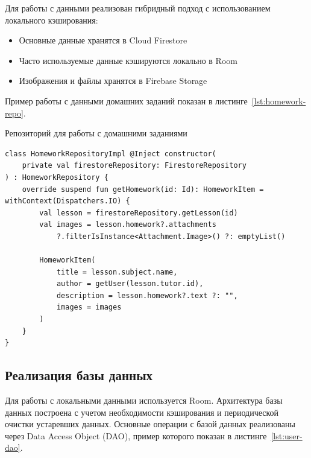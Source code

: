 \documentclass[14pt, russian]{scrartcl}
\begin{document}
Для работы с данными реализован гибридный подход с использованием локального кэширования:
\begin{itemize}
\item Основные данные хранятся в Cloud Firestore
\item Часто используемые данные кэшируются локально в Room
\item Изображения и файлы хранятся в Firebase Storage
\end{itemize}

Пример работы с данными домашних заданий показан в листинге~\ref{lst:homework-repo}.

\begin{listing}[!htb]
\caption{Репозиторий для работы с домашними заданиями}
\vspace{-0.3cm}
\label{lst:homework-repo}
\begin{verbatim}
class HomeworkRepositoryImpl @Inject constructor(
    private val firestoreRepository: FirestoreRepository
) : HomeworkRepository {
    override suspend fun getHomework(id: Id): HomeworkItem = withContext(Dispatchers.IO) {
        val lesson = firestoreRepository.getLesson(id)
        val images = lesson.homework?.attachments
            ?.filterIsInstance<Attachment.Image>() ?: emptyList()

        HomeworkItem(
            title = lesson.subject.name,
            author = getUser(lesson.tutor.id),
            description = lesson.homework?.text ?: "",
            images = images
        )
    }
}
\end{verbatim}
\end{listing}


\subsection{Реализация базы данных}\label{sect:database}

Для работы с локальными данными используется Room. Архитектура базы данных построена с учетом необходимости кэширования и периодической очистки устаревших данных. Основные операции с базой данных реализованы через Data Access Object (DAO), пример которого показан в листинге~\ref{lst:user-dao}.
\end{document}
